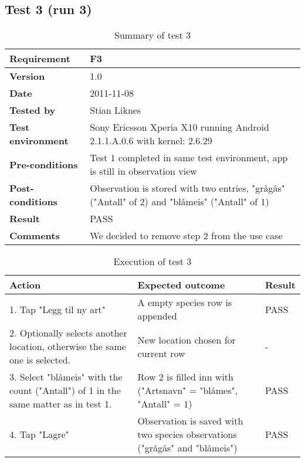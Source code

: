 \newpage
\subsection*{Test 3 (run 3)}

	\begin{table}[htb]
		\centering
		\begin{tabular}{|p{3.5cm}|p{7.0cm}|} \hline
			\textbf{Requirement} & F3 \\ \hline
			\textbf{Version} & 1.0 \\ \hline
			\textbf{Date} & 2011-11-08 \\ \hline
			\textbf{Tested by} & Stian Liknes \\ \hline
			\textbf{Test environment} & Sony Ericsson Xperia X10 running Android 2.1.1.A.0.6 with kernel: 2.6.29 \\ \hline
			\textbf{Pre-conditions} & Test 1 completed in same test environment, app is still in observation view \\ \hline
			\textbf{Post-conditions} & Observation is stored with two entries, "grågås" ("Antall" of 2) and "blåmeis" ("Antall" of 1) \\ \hline
			\textbf{Result} & PASS \\ \hline
			\textbf{Comments} & We decided to remove step 2 from the use case \\ \hline
		\end{tabular}
		\caption{Summary of test 3}
	\end{table}

	\begin{table}[htb]
		\centering
		\begin{tabular}{|p{5.0cm}|p{5.0cm}|p{1cm}|}
			\hline \textbf{Action} & \textbf{Expected outcome} & \textbf{Result} \\ \hline

			1. Tap "Legg til ny art" &
			A empty species row is appended &
			PASS \\ \hline
			
			2. Optionally selects another location, otherwise the same one is
			selected. & 
			New location chosen for current row &
			- \\ \hline

			3. Select "blåmeis" with the count ("Antall") of 1 in the same matter 
			as in test 1. &
			Row 2 is filled inn with ("Artsnavn" = "blåmes", "Antall" = 1) &
			PASS \\ \hline

			4. Tap "Lagre" &
			Observation is saved with two species observations ("grågås" and "blåmeis") &
			PASS \\ \hline
		\end{tabular}
		\caption{Execution of test 3}
	\end{table}

